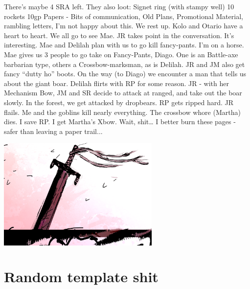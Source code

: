 \documentclass[letterpaper,10pt,twoside,twocolumn,openany]{book}
\begin{document}
There's maybe 4 SRA left.
They also loot: Signet ring (with stampy well) 10 rockets 10gp
Papers - Bits of communication, Old Plans, Promotional Material, rambling letters,
I’m not happy about this.
We rest up.
Kolo and Otario have a heart to heart.
We all go to see Mae. JR takes point in the conversation. It’s interesting. Mae and Delilah plan with us to go kill fancy-pants.
I’m on a horse.
Mae gives us 3 people to go take on Fancy-Pants, Diago. One is an Battle-axe barbarian type, others a Crossbow-marksman, as is Delilah.
JR and JM also get fancy “dutty ho” boots.
On the way (to Diago) we encounter a man that tells us about the giant boar. Delilah flirts with RP for some reason.
JR - with her Mechanism Bow, JM and SR decide to attack at ranged, and take out the boar slowly.
In the forest, we get attacked by dropbears.
RP gets ripped hard. JR flails.
Me and the goblins kill nearly everything.
The crossbow whore (Martha) dies.
I save RP.
I get Martha’s Xbow.
Wait, shit… I better burn these pages - safer than leaving a paper trail... 

\begin{center}
\includegraphics[width=80mm]{./img/otoriagrave.png}
\begin{figure}[h]
\end{figure}
\end{center}

\clearpage
 
 \chapter{Random template shit}
\clearpage
\end{document}
